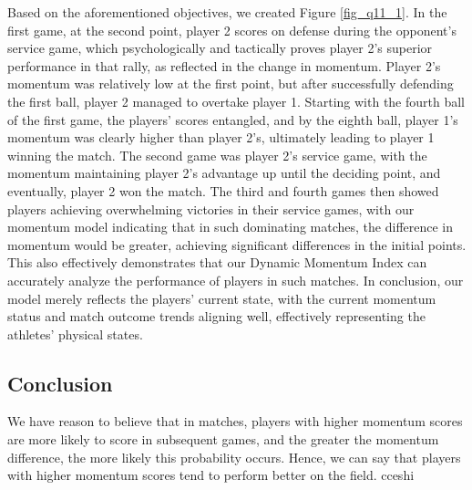 \documentclass{mcmthesis}
\begin{document}
Based on the aforementioned objectives, we created Figure \ref{fig_q11_1}. In the first game, at the second point, player 2 scores on defense during the opponent's service game, which psychologically and tactically proves player 2's superior performance in that rally, as reflected in the change in momentum. Player 2's momentum was relatively low at the first point, but after successfully defending the first ball, player 2 managed to overtake player 1. Starting with the fourth ball of the first game, the players' scores entangled, and by the eighth ball, player 1's momentum was clearly higher than player 2's, ultimately leading to player 1 winning the match. The second game was player 2's service game, with the momentum maintaining player 2's advantage up until the deciding point, and eventually, player 2 won the match. The third and fourth games then showed players achieving overwhelming victories in their service games, with our momentum model indicating that in such dominating matches, the difference in momentum would be greater, achieving significant differences in the initial points. This also effectively demonstrates that our Dynamic Momentum Index can accurately analyze the performance of players in such matches. In conclusion, our model merely reflects the players' current state, with the current momentum status and match outcome trends aligning well, effectively representing the athletes' physical states.
\subsection{Conclusion}
We have reason to believe that in matches, players with higher momentum scores are more likely to score in subsequent games, and the greater the momentum difference, the more likely this probability occurs. Hence, we can say that players with higher momentum scores tend to perform better on the field.
cceshi
\end{document}
